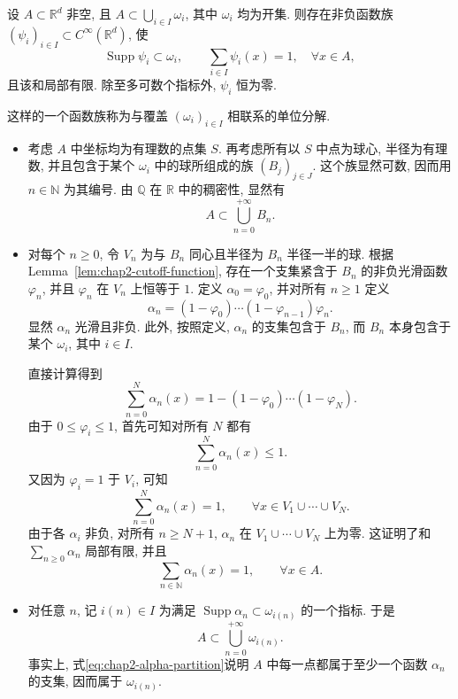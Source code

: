 \begin{Lemma}
\label{lem:chap2-partition-of-unity}
设 $A\subset\mathbb{R}^d$ 非空, 且 $A\subset\bigcup_{i\in I}\omega_i$, 其中 $\omega_i$ 均为开集. 则存在非负函数族 $(\psi_i)_{i\in I}\subset C^\infty(\mathbb{R}^d)$, 使
\[
 \operatorname{Supp}\psi_i\subset\omega_i,
 \qquad\sum_{i\in I}\psi_i(x)=1,\quad\forall x\in A,
\]
且该和局部有限. 除至多可数个指标外, $\psi_i$ 恒为零.
\end{Lemma}

这样的一个函数族称为与覆盖 $(\omega_i)_{i\in I}$ 相联系的单位分解.

\begin{Proof}
\begin{itemize}
\item 考虑 $A$ 中坐标均为有理数的点集 $S$. 再考虑所有以 $S$ 中点为球心, 半径为有理数, 并且包含于某个 $\omega_i$ 中的球所组成的族 $(B_j)_{j\in J}$. 这个族显然可数, 因而用 $n\in\mathbb{N}$ 为其编号. 由 $\mathbb{Q}$ 在 $\mathbb{R}$ 中的稠密性, 显然有
\[
  A\subset\bigcup_{n=0}^{+\infty}B_n.
\]

\item 对每个 $n\geq0$, 令 $V_n$ 为与 $B_n$ 同心且半径为 $B_n$ 半径一半的球. 根据 Lemma~\ref{lem:chap2-cutoff-function}, 存在一个支集紧含于 $B_n$ 的非负光滑函数 $\varphi_n$, 并且 $\varphi_n$ 在 $V_n$ 上恒等于 $1$. 定义 $\alpha_0=\varphi_0$, 并对所有 $n\geq1$ 定义
\[
  \alpha_n=(1-\varphi_0)\cdots(1-\varphi_{n-1})\varphi_n.
\]
显然 $\alpha_n$ 光滑且非负. 此外, 按照定义, $\alpha_n$ 的支集包含于 $B_n$, 而 $B_n$ 本身包含于某个 $\omega_i$, 其中 $i\in I$.

直接计算得到
\[
  \sum_{n=0}^{N}\alpha_n(x)
  =1-(1-\varphi_0)\cdots(1-\varphi_N).
\]
由于 $0\leq\varphi_i\leq1$, 首先可知对所有 $N$ 都有
\[
  \sum_{n=0}^{N}\alpha_n(x)\leq1.
\]
又因为 $\varphi_i=1$ 于 $V_i$, 可知
\[
  \sum_{n=0}^{N}\alpha_n(x)=1,
  \qquad\forall x\in V_1\cup\cdots\cup V_N.
\]
由于各 $\alpha_i$ 非负, 对所有 $n\geq N+1$, $\alpha_n$ 在 $V_1\cup\cdots\cup V_N$ 上为零. 这证明了和 $\sum_{n\geq0}\alpha_n$ 局部有限, 并且
\begin{equation}
  \sum_{n\in\mathbb{N}}\alpha_n(x)=1,
  \qquad\forall x\in A.
  \label{eq:chap2-alpha-partition}
\end{equation}

\item 对任意 $n$, 记 $i(n)\in I$ 为满足 $\operatorname{Supp}\alpha_n\subset\omega_{i(n)}$ 的一个指标. 于是
\[
  A\subset\bigcup_{n=0}^{+\infty}\omega_{i(n)}.
\]
事实上, 式\eqref{eq:chap2-alpha-partition}说明 $A$ 中每一点都属于至少一个函数 $\alpha_n$ 的支集, 因而属于 $\omega_{i(n)}$.


\end{itemize}
\end{Proof}
